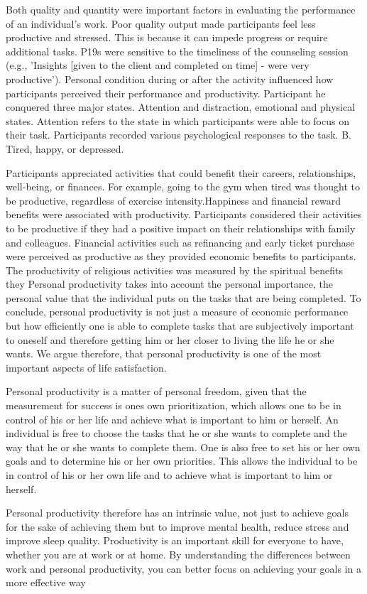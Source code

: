 Both quality and quantity were important factors in evaluating the performance of an individual's work. Poor quality output  made participants feel less productive and stressed. This is because it can impede progress or require additional tasks. P19s were sensitive to the timeliness of the counseling session (e.g., 'Insights [given to the client and completed on time] - were very productive'). Personal condition during or after the activity influenced how participants perceived their performance and productivity. Participant he conquered three major states.
Attention and distraction, emotional  and physical states. Attention refers to the state in which participants were able to focus on their task. Participants recorded various psychological responses to the task. B. Tired, happy, or depressed.

Participants appreciated activities that could benefit their careers, relationships, well-being, or finances. For example, going to the gym  when tired was thought to be productive, regardless of exercise intensity.Happiness and financial reward benefits were associated with productivity. Participants considered their activities to be productive if they had a positive impact on their relationships with family and colleagues. Financial activities such as refinancing and early ticket purchase were perceived as productive as they provided economic benefits to participants. The productivity of religious activities was measured by the spiritual benefits they
Personal productivity takes into account the personal importance, the personal value that the individual puts on the tasks that are
being completed.
To  conclude, personal productivity is not just a measure of economic performance but how efficiently one is able to complete tasks that are subjectively important to oneself and therefore getting him or her closer to living the life he or she wants. We argue therefore, that personal productivity is one of the most important aspects of life satisfaction.

Personal productivity is a matter of personal freedom, given that the measurement for success is ones own prioritization, which allows one to be in control of his or her life and achieve what is important to him or herself.
An individual is free to choose the tasks that he or she wants to complete and the way that he or she wants to complete them.  One is also free to set his or her own goals and to determine his or her own priorities. This allows the individual to be in control of his or her own life and to achieve what is important to him or herself.

Personal productivity therefore has an intrinsic value, not just to achieve goals for the sake of achieving them but to improve mental health, reduce stress and improve sleep quality.
Productivity is an important skill for everyone to have, whether you are at work or at home. By understanding the differences between work and personal productivity, you can better focus on achieving your goals in a more effective way
%



